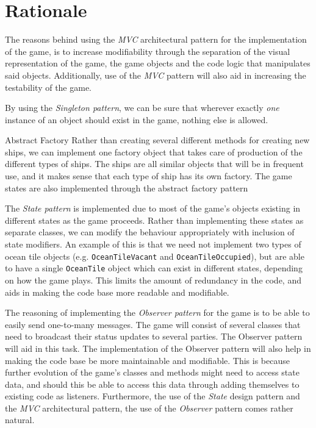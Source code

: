 \chapter{Rationale}
    

The reasons behind using the \emph{MVC} architectural pattern for the implementation of the game, is to increase modifiability through the separation of the visual representation of the game, the game objects and the code logic that manipulates said objects. Additionally, use of the \emph{MVC} pattern will also aid in increasing the testability of the game.


By using the \emph{Singleton pattern}, we can be sure that wherever exactly \emph{one} instance of an object should exist in the game, nothing else is allowed.


Abstract Factory
Rather than creating several different methods for creating new ships, we can implement one factory object that takes care of production of the different types of ships. The ships are all similar objects that will be in frequent use, and it makes sense that each type of ship has its own factory.
The game states are also implemented through the abstract factory pattern


The \emph{State pattern} is implemented due to most of the game's objects existing in different states as the game proceeds. Rather than implementing these states as separate classes, we can modify the behaviour appropriately with inclusion of state modifiers. An example of this is that we need not implement two types of ocean tile objects (e.g. \texttt{OceanTileVacant} and \texttt{OceanTileOccupied}), but are able to have a single \texttt{OceanTile} object which can exist in different states, depending on how the game plays. This limits the amount of redundancy in the code, and aids in making the code base more readable and modifiable.


The reasoning of implementing the \emph{Observer pattern} for the game is to be able to easily send one-to-many messages. The game will consist of several classes that need to broadcast their status updates to several parties. The Observer pattern will aid in this task. The implementation of the Observer pattern will also help in making the code base be more maintainable and modifiable. This is because further evolution of the game's classes and methods might need to access state data, and should this be able to access this data through adding themselves to existing code as listeners. Furthermore, the use of the \emph{State} design pattern and the \emph{MVC} architectural pattern, the use of the \emph{Observer} pattern comes rather natural.